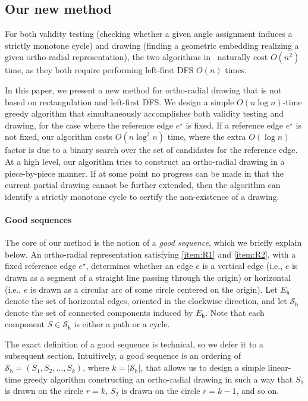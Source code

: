 \documentclass{article}\usepackage[a4paper,margin=20mm]{geometry}
\newcommand{\EH}{E_\mathsf{h}}
\newcommand{\PH}{\mathcal{S}_\mathsf{h}}
\newcommand{\eref}{e^\star}
\begin{document}
\subsection{Our new method}

For both validity testing (checking whether a given angle assignment induces a strictly monotone cycle) and drawing (finding a geometric embedding realizing a given ortho-radial representation), the two algorithms in~\cite{barth2023topology} naturally cost $O(n^2)$ time, as they both require performing left-first DFS  $O(n)$ times.

In this paper, we present a new method for ortho-radial drawing that is not based on rectangulation and left-first DFS. 
We design a simple $O(n \log n)$-time greedy algorithm that simultaneously accomplishes both validity testing and drawing, for the case where the reference edge $\eref$ is fixed. If a reference edge $\eref$ is not fixed, our algorithm costs $O(n \log^2 n)$ time, where the extra $O(\log n)$ factor is due to a binary search over the set of  candidates for the reference edge.
 At a high level, our algorithm tries to construct an ortho-radial drawing in a piece-by-piece manner. If at some point no progress can be made in that the current partial drawing cannot be further extended, then the algorithm can identify a strictly monotone cycle to certify the non-existence of a drawing. 
 
 \paragraph{Good sequences} The core of our method is the notion of a \emph{good sequence}, which we briefly explain below. An ortho-radial representation satisfying \ref{item:R1} and \ref{item:R2}, with a fixed reference edge $\eref$, determines whether an edge $e$ is a vertical edge (i.e., $e$ is drawn as a  segment of  a straight line passing through the origin) or  horizontal  (i.e., $e$ is drawn as a circular arc of some circle
centered on the origin). Let $\EH$ denote the set of horizontal edges, oriented in the clockwise direction, and let $\PH$ denote the set of connected components induced by $\EH$. Note that each component $S \in \PH$ is either a path or a cycle.

The exact definition of a good sequence is technical, so we defer it to a subsequent section. Intuitively, a good sequence is  an ordering of $\PH=(S_1, S_2, \ldots, S_{k})$, where $k = |\PH|$, that allows us to design
a simple linear-time greedy algorithm constructing an ortho-radial drawing in such a way that $S_1$ is drawn on the circle $r=k$, $S_2$ is drawn on the circle $r = k-1$, and so on. 
 
\end{document}
